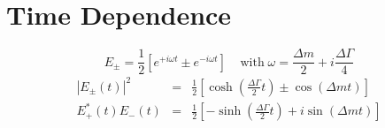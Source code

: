 \documentclass[a4paper,9pt,twoside]{article}
\begin{document}

\section{Time Dependence}

\begin{equation}
  E_\pm = \frac{1}{2} \left[ e^{+i\omega t } \pm e^{-i\omega t } \right]\;\;\;\;\mathrm{with}\;
   \omega = \frac{\Delta m}{2} + i\frac{\Delta \Gamma}{4} 
\end{equation}
\begin{eqnarray}
 | E_\pm(t) |^2  &=& \frac{1}{2}\left[ \cosh\left(\frac{\Delta\Gamma}{2}t\right) \pm \cos\left(\Delta m t \right) \right] \\
 E_+^*(t)E_-(t)  &=& \frac{1}{2}\left[ -\sinh\left(\frac{\Delta\Gamma}{2}t\right) + i \sin\left(\Delta m t \right) \right]
\end{eqnarray}
\end{document}
